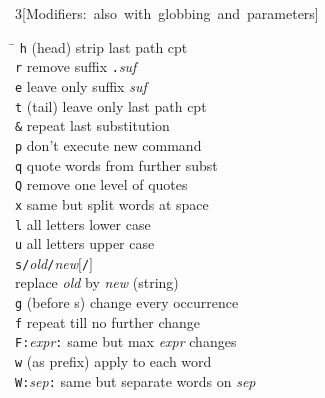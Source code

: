 \documentclass{article}
\newcommand\I[1]{\textsl{#1}}
\newcommand\T[1]{\texttt{#1}}
\newcommand\Lsq{\ensuremath{\boldsymbol{[}}}
\newcommand\Rsq{\ensuremath{\boldsymbol{]}}}
\begin{document}
\begin{multicols}{3}[\mbox{Modifiers: also with globbing and parameters}]
\begin{tabbing}
\hskip 60pt \= \kill
\T{h}           \> (head) strip last path cpt \\
\T{r}           \> remove suffix \verb!.!\I{suf} \\
\T{e}           \> leave only suffix \I{suf} \\
\T{t}           \> (tail) leave only last path cpt \\
\verb!&!        \> repeat last substitution \\
\T{p}           \> don't execute new command \\
\T{q}           \> quote words from further subst \\
\T{Q}		\> remove one level of quotes \\
\T{x}           \> same but split words at space \\
\T{l}           \> all letters lower case \\
\T{u}           \> all letters upper case \\
\verb!s/!\I{old}\verb!/!\I{new}\Lsq\verb!/!\Rsq \\
                \> replace \I{old} by \I{new} (string) \\
\T{g}           \> (before s) change every occurrence \\
\T{f}           \> repeat till no further change \\
\verb!F:!\I{expr}\verb!:! \> same but max \I{expr} changes \\
\T{w}           \> (as prefix) apply to each word \\
\verb!W:!\I{sep}\verb!:! \> same but separate words on \I{sep} \\
\end{tabbing}
\end{multicols}
\end{document}
